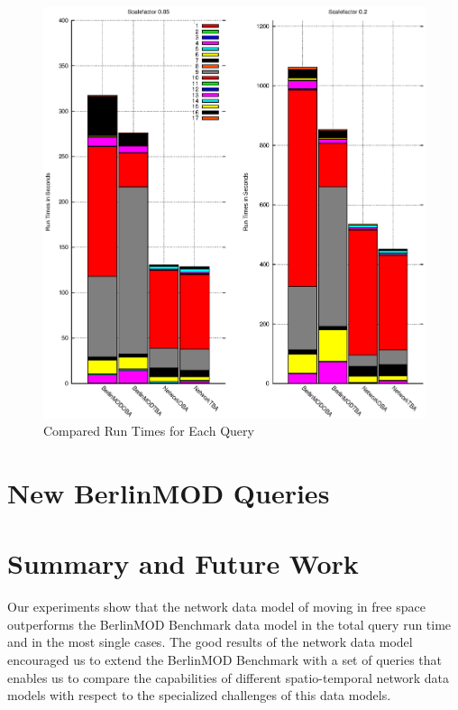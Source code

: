 \documentclass[a4paper]{article}
\newcommand{\bmodb} {BerlinMOD Benchmark}
\begin{document}
\begin{figure}
\begin{center}
	\includegraphics[width=17.0cm]{compruntimesall.eps}
	\caption{Compared Run Times for Each Query}
	\label{fig:compruntimesall}
\end{center}
\end{figure}

\section{New BerlinMOD Queries}
\label{sec:newqueries}
\section{Summary and Future Work}
\label{sec:summary}
Our experiments show that the network data model of moving in free space
 outperforms the \bmodb{} data model in the total query run time and in the most
single cases. The good results of the network data model encouraged us to extend
the \bmodb{} with a set of queries that enables us to compare the capabilities of
 different spatio-temporal network data models with respect to the specialized
 challenges of this data models.

{}

\end{document}
